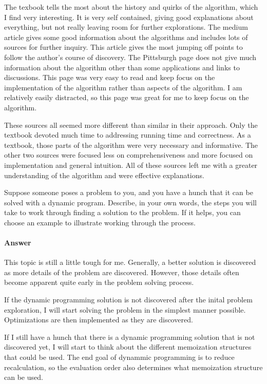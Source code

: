 \documentclass{article}
\begin{document}
The texbook tells the most about the history and quirks of the algorithm, which I
find very interesting. It is very self contained, giving good explanations about
everything, but not really leaving room for further explorations. The medium article
gives some good information about the algorithms and includes lots of sources
for further inquiry. This article gives the most jumping off points to follow the
author's course of discovery. The Pittsburgh page does not give much information
about the algorithm other than some applications and links to discussions. This
page was very easy to read and keep focus on the implementation of the algorithm
rather than aspects of the algorithm. I am relatively easily distracted, so this
page was great for me to keep focus on the algorithm.

These sources all seemed more different than similar in their approach. Only the
textbook devoted much time to addressing running time and correctness. As a textbook,
those parts of the algorithm were very necessary and informative. The other two
sources were focused less on comprehensiveness and more focused on implementation
and general intuition. All of these sources left me with a greater
understanding of the algorithm and were effective explanations.

\collab{\todo{}}

Suppose someone poses a problem to you, and you have a hunch that it can be
solved with a dynamic program.  Describe, in your own words, the steps you will
take to work through finding a solution to the problem.  If it helps, you can
choose an example to illustrate working through the process.

\paragraph{Answer}

This topic is still a little tough for me. Generally, a better solution is discovered
as more details of the problem are discovered. However, those details often become
apparent quite early in the problem solving process.

If the dynamic programming solution is not discovered after the inital problem
exploration, I will start solving the problem in the simplest manner possible.
Optimizations are then implemented as they are discovered.

If I still have a hunch that there is a dynamic programming solution that is not
discovered yet, I will start to think about the different memoization structures
that could be used. The end goal of dynammic programming is to reduce recalculation,
so the evaluation order also determines what memoization structure can be used.
\end{document}
